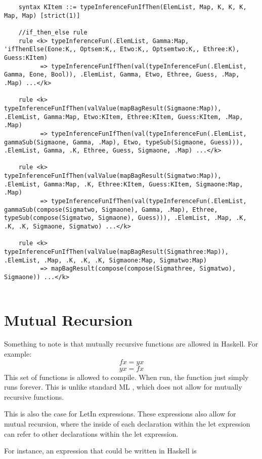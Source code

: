 \begin{lstlisting}
    syntax KItem ::= typeInferenceFunIfThen(ElemList, Map, K, K, K, Map, Map) [strict(1)]

    //if_then_else rule
    rule <k> typeInferenceFun(.ElemList, Gamma:Map, 'ifThenElse(Eone:K,, Optsem:K,, Etwo:K,, Optsemtwo:K,, Ethree:K), Guess:KItem)
          => typeInferenceFunIfThen(val(typeInferenceFun(.ElemList, Gamma, Eone, Bool)), .ElemList, Gamma, Etwo, Ethree, Guess, .Map, .Map) ...</k>

    rule <k> typeInferenceFunIfThen(valValue(mapBagResult(Sigmaone:Map)), .ElemList, Gamma:Map, Etwo:KItem, Ethree:KItem, Guess:KItem, .Map, .Map)
          => typeInferenceFunIfThen(val(typeInferenceFun(.ElemList, gammaSub(Sigmaone, Gamma, .Map), Etwo, typeSub(Sigmaone, Guess))), .ElemList, Gamma, .K, Ethree, Guess, Sigmaone, .Map) ...</k>

    rule <k> typeInferenceFunIfThen(valValue(mapBagResult(Sigmatwo:Map)), .ElemList, Gamma:Map, .K, Ethree:KItem, Guess:KItem, Sigmaone:Map, .Map)
          => typeInferenceFunIfThen(val(typeInferenceFun(.ElemList, gammaSub(compose(Sigmatwo, Sigmaone), Gamma, .Map), Ethree, typeSub(compose(Sigmatwo, Sigmaone), Guess))), .ElemList, .Map, .K, .K, .K, Sigmaone, Sigmatwo) ...</k>

    rule <k> typeInferenceFunIfThen(valValue(mapBagResult(Sigmathree:Map)), .ElemList, .Map, .K, .K, .K, Sigmaone:Map, Sigmatwo:Map)
          => mapBagResult(compose(compose(Sigmathree, Sigmatwo), Sigmaone)) ...</k>
          
\end{lstlisting}

\section{Mutual Recursion}
Something to note is that mutually recursive functions are allowed in Haskell.
For example:
$$
f x = y x
$$
$$
y x = f x
$$
This set of functions is allowed to compile. When run, the function just simply runs forever. This is unlike standard ML \cite{Milner90thedefinition}, which does not allow for mutually recursive functions.

This is also the case for LetIn expressions. These expressions also allow for mutual recursion, where the inside of each declaration within the let expression can refer to other declarations within the let expression.

For instance, an expression that could be written in Haskell is

